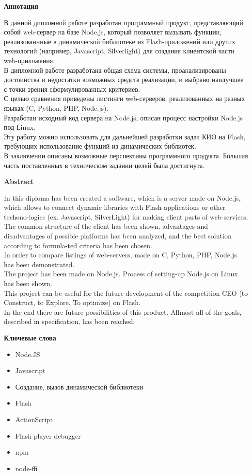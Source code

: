 \begin{center}
\textbf{Аннотация}
\end{center}
В данной дипломной работе разработан программный продукт, представляющий собой web-сервер на базе Node.js, который позволяет вызывать функции, реализованнные в динамической библиотеке из Flash-приложений или других технологий (например, Javascript, Silverlight) для создания клиентской части web-приложения.\\
В дипломной работе разработана общая схема системы, проанализированы достоинства и недостатки возможных средств реализации, и выбрано наилучшее с точки зрения сформулированных критериев. \\
С целью сравнения приведены листинги web-серверов, реализованных на разных языках (C, Python, PHP, Node.js).\\
Разработан исходный код сервера на Node.js, описан процесс настройки Node.js под Linux.\\
Эту работу можно использовать для дальнейшей разработки задач КИО на Flash, требующих использование функций из динамических библиотек. \\
В заключении описаны возможные перспективы программного продукта. Большая часть поставленных в техническом задании целей была достигнута.

\newpage
\begin{center}
\textbf{Abstract}
\end{center}
In this diploma has been created a software, which is a server made on Node.js, which allows to connect dynamic libraries with Flash-applications or other techono-logies (ex. Javascript, SilverLight) for making client parts of web-services.\\
The common structure of the client has been shown, advantages and disadvantages of possible platforms has been analyzed, and the best solution according to formula-ted criteria has been chosen.\\
In order to compare listings of web-servers, made on C, Python, PHP, Node.js has been demonstrated.\\
The project has been made on Node.js. Process of setting-up Node.js on Linux has been shown.\\
This project can be useful for the future development of the competition CEO (to Construct, to Explore, To optimize) on Flash.\\
In the end there are future possibilities of this product. Allmost all of the goals, described in specification, has been reached.

\newpage
\begin{center}
\textbf{Ключевые слова}
\end{center}
\begin{itemize}
  \item Node.JS
  \item Javascript
  \item Создание, вызов динамической библиотеки
  \item Flash
  \item ActionScript
  \item Flash player debugger
  \item npm
  \item node-ffi
\end{itemize}